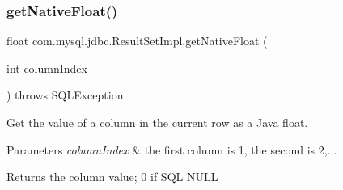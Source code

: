 \subsubsection{\texorpdfstring{get\+Native\+Float()}{getNativeFloat()}}
{\footnotesize\ttfamily float com.\+mysql.\+jdbc.\+Result\+Set\+Impl.\+get\+Native\+Float (\begin{DoxyParamCaption}\item[{int}]{column\+Index }\end{DoxyParamCaption}) throws S\+Q\+L\+Exception\hspace{0.3cm}{\ttfamily [protected]}}

Get the value of a column in the current row as a Java float.


\begin{DoxyParams}{Parameters}
{\em column\+Index} & the first column is 1, the second is 2,...\\
\hline
\end{DoxyParams}
\begin{DoxyReturn}{Returns}
the column value; 0 if S\+QL N\+U\+LL
\end{DoxyReturn}


